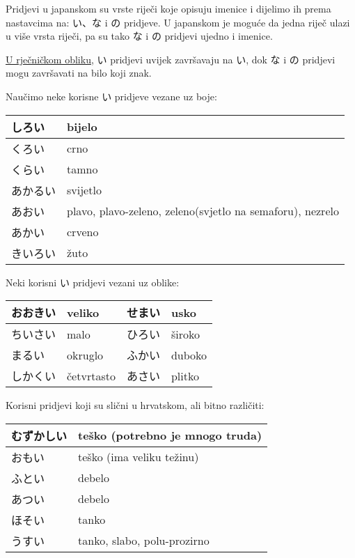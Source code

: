 \newpage
{}


	
	Pridjevi u japanskom su vrste riječi koje opisuju imenice i dijelimo ih prema nastavcima na: い、な i の pridjeve. U japanskom je moguće da jedna riječ ulazi u više vrsta riječi, pa su tako な i の pridjevi ujedno i imenice.
	
\underline{U rječničkom obliku}, い pridjevi uvijek završavaju na い, dok な i の pridjevi mogu završavati na bilo koji znak.



Naučimo neke korisne い pridjeve vezane uz boje:

	\vspace{10pt}
	\begin{tabular}{|l|l|}
		\hline
		しろい&bijelo\\\hline
		くろい&crno\\\hline
		くらい&tamno\\\hline
		あかるい&svijetlo\\\hline
		あおい&plavo, plavo-zeleno, zeleno(svjetlo na semaforu), nezrelo\\\hline
		あかい&crveno\\\hline
		きいろい&žuto\\\hline
	\end{tabular}
	
\vspace{10pt}
Neki korisni い pridjevi vezani uz oblike:
	
	\vspace{10pt}
	\begin{tabular}{|l|l|l|l|}
		\hline
		おおきい&veliko&せまい&usko\\\hline
		ちいさい&malo&ひろい&široko\\\hline
		まるい&okruglo&ふかい&duboko\\\hline
		しかくい&četvrtasto&あさい&plitko\\\hline
	\end{tabular}
	
\vspace{10pt}
Korisni pridjevi koji su slični u hrvatskom, ali bitno različiti:
	
	\vspace{10pt}
	\begin{tabular}{|l|l|}
		\hline
		むずかしい&teško (potrebno je mnogo truda)\\\hline
		おもい&teško (ima veliku težinu)\\\hline
		ふとい&debelo\\\hline
		あつい&debelo\\\hline
		ほそい&tanko\\\hline
		うすい&tanko, slabo, polu-prozirno\\\hline
	\end{tabular}
	
